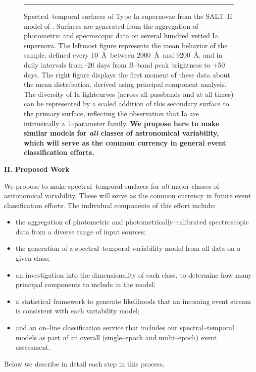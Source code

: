 \begin{figure}[t]
\centerline{ \hfil
{}} \smallskip
\caption[]{\footnotesize Spectral--temporal surfaces of Type Ia supernovae from
the SALT--II model of \cite{2007A&A...466...11G}.  Surfaces are generated from
the aggregation of photometric and specroscopic data on several hundred vetted
Ia supernova.  The leftmost figure represents the mean behavior of the sample,
defined every 10~\AA~between 2000~\AA~and 9200~\AA, and in daily intervals from
-20 days from B--band peak brightness to +50 days.  The right figure displays
the first moment of these data about the mean distribution, derived using
principal component analysis.  The diversity of Ia lightcurves (across all
passbands and at all times) can be represented by a scaled addition of this
secondary surface to the primary surface, reflecting the observation that Ia are
intrinsically a 1--parameter family.  {\bf We propose here to make similar
models for {\it all} classes of astronomical variability, which will serve as
the common currency in general event classification efforts.}} \medskip \hrule
\label{fig:salt2} \end{figure}

\bigskip \centerline{\bf II. Proposed Work} \smallskip

We propose to make spectral--temporal surfaces for {\it all} major classes of
astronomical variability. These will serve as the common currency in future
event classification efforts.  The individual components of this effort include:

\begin{itemize}

\item the aggregation of photometric and photometrically--calibrated
spectroscopic data from a diverse range of input sources;

\item the generation of a spectral--temporal variability model from all data on
a given class;

\item an investigation into the dimensionality of each class, to determine how
many principal components to include in the model;

\item a statistical framework to generate likelihoods that an incoming event
stream is consistent with each variability model;

\item and an on--line classification service that includes our
spectral--temporal models as part of an overall (single--epoch and multi--epoch)
event assessment.

\end{itemize}
Below we describe in detail each step in this process.


